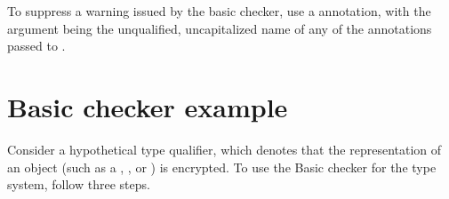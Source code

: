 To suppress a warning issued by the basic checker, use a 
annotation, with the argument being the unqualified, uncapitalized name of
any of the annotations passed to .


\section{Basic checker example\label{basic-example}\label{encrypted-example}}

Consider a hypothetical  type qualifier, which denotes that the
representation of an object (such as a , , or
) is encrypted. To use the Basic checker for the 
type system, follow three steps.

